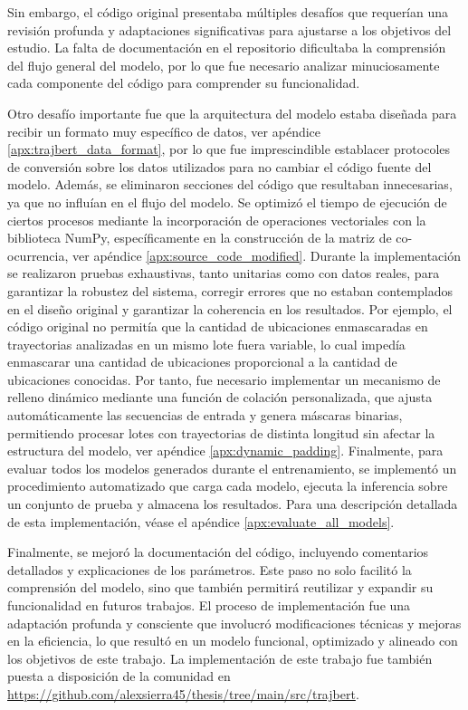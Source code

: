 Sin embargo, el código original presentaba múltiples desafíos que requerían una revisión profunda y adaptaciones significativas para ajustarse a los objetivos del estudio. La falta de documentación en el repositorio dificultaba la comprensión del flujo general del modelo, por lo que fue necesario analizar minuciosamente cada componente del código para comprender su funcionalidad.

Otro desafío importante fue que la arquitectura del modelo estaba diseñada para recibir un formato muy específico de datos, ver apéndice  \ref{apx:trajbert_data_format}, por lo que fue imprescindible establacer protocoles de conversión sobre los datos utilizados para no cambiar el código fuente del modelo. Además, se eliminaron secciones del código que resultaban innecesarias, ya que no influían en el flujo del modelo. Se optimizó el tiempo de ejecución de ciertos procesos mediante la incorporación de operaciones vectoriales con la biblioteca NumPy, específicamente en la construcción de la matriz de co-ocurrencia, ver apéndice \ref{apx:source_code_modified}. Durante la implementación se realizaron pruebas exhaustivas, tanto unitarias como con datos reales, para garantizar la robustez del sistema, corregir errores que no estaban contemplados en el diseño original y garantizar la coherencia en los resultados. Por ejemplo, el código original no permitía que la cantidad de ubicaciones enmascaradas en trayectorias analizadas en un mismo lote fuera variable, lo cual impedía enmascarar una cantidad de ubicaciones proporcional a la cantidad de ubicaciones conocidas. Por tanto, fue necesario implementar un mecanismo de relleno dinámico mediante una función de colación personalizada, que ajusta automáticamente las secuencias de entrada y genera máscaras binarias, permitiendo procesar lotes con trayectorias de distinta longitud sin afectar la estructura del modelo, ver apéndice \ref{apx:dynamic_padding}. Finalmente, para evaluar todos los modelos generados durante el entrenamiento, se implementó un procedimiento automatizado que carga cada modelo, ejecuta la inferencia sobre un conjunto de prueba y almacena los resultados. Para una descripción detallada de esta implementación, véase el apéndice \ref{apx:evaluate_all_models}.

Finalmente, se mejoró la documentación del código, incluyendo comentarios detallados y explicaciones de los parámetros. Este paso no solo facilitó la comprensión del modelo, sino que también permitirá reutilizar y expandir su funcionalidad en futuros trabajos. El proceso de implementación fue una adaptación profunda y consciente que involucró modificaciones técnicas y mejoras en la eficiencia, lo que resultó en un modelo funcional, optimizado y alineado con los objetivos de este trabajo. La implementación de este trabajo fue también puesta a disposición de la comunidad en \url{https://github.com/alexsierra45/thesis/tree/main/src/trajbert}.

